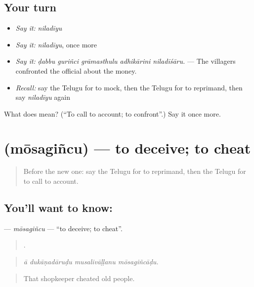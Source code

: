 \subsection*{Your turn}
\begin{itemize}
\raggedright
  \item \emph{Say it:} \emph{niladīyu}
  \item \emph{Say it:} \emph{niladīyu}, once more
  \item \emph{Say it:} \emph{ḍabbu guriñci grāmasthulu adhikārini niladīśāru.} — The villagers confronted the official about the money.
  \item \emph{Recall:} say the Telugu for to mock, then the Telugu for to reprimand, then say \emph{niladīyu} again
\end{itemize}

\begin{tcolorbox}[breakable,colback=teal!4,colframe=teal!35!black,title={Before you move on}]
What does  mean? (\textquotedblleft{}To call to account; to confront\textquotedblright{}.) Say it once more.
\end{tcolorbox}
\section[\texorpdfstring{\te{మోసగించు} (mōsagiñcu)}{మోసగించు (mōsagiñcu)}]{ (mōsagiñcu) — to deceive; to cheat}

\label{lesson:TE-C535-mosagincu}



\begin{quote}
Before the new one: say the Telugu for to reprimand, then the Telugu for to call to account.
\end{quote}

\subsection*{You'll want to know: }
\textbf{} — \emph{mōsagiñcu} — \textquotedblleft{}to deceive; to cheat\textquotedblright{}.

\begin{quote}
   .
\end{quote}

\begin{quote}
\emph{ā dukāṇadāruḍu musalivāḷḷanu mōsagiñcāḍu.}
\end{quote}

\begin{quote}
That shopkeeper cheated old people.
\end{quote}

